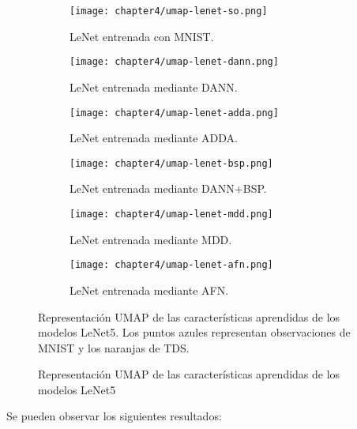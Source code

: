 \begin{figure}[H]
    \centering
    \begin{subfigure}[h]{0.40\textwidth}
        \texttt{[image: chapter4/umap-lenet-so.png]}
        \caption{LeNet entrenada con MNIST.}
        \label{fig:umap-lenet-so}
    \end{subfigure}
    \hfill
    \begin{subfigure}[h]{0.40\textwidth}
        \texttt{[image: chapter4/umap-lenet-dann.png]}
        \caption{LeNet entrenada mediante DANN.}
        \label{fig:umap-lenet-dann}
    \end{subfigure}
    \hfill
    \begin{subfigure}[h]{0.40\textwidth}
        \texttt{[image: chapter4/umap-lenet-adda.png]}
        \caption{LeNet entrenada mediante ADDA.}
        \label{fig:umap-lenet-adda}
    \end{subfigure}
    \hfill
    \begin{subfigure}[h]{0.40\textwidth}
        \texttt{[image: chapter4/umap-lenet-bsp.png]}
        \caption{LeNet entrenada mediante DANN+BSP.}
        \label{fig:umap-lenet-bsp}
    \end{subfigure}
    \hfill
    \begin{subfigure}[h]{0.40\textwidth}
        \texttt{[image: chapter4/umap-lenet-mdd.png]}
        \caption{LeNet entrenada mediante MDD.}
        \label{fig:umap-lenet-mdd}
    \end{subfigure}
    \hfill
    \begin{subfigure}[h]{0.40\textwidth}
        \texttt{[image: chapter4/umap-lenet-afn.png]}
        \caption{LeNet entrenada mediante AFN.}
        \label{fig:umap-lenet-afn}
    \end{subfigure}

    \caption{Representación UMAP de las características aprendidas de los modelos LeNet5}{Representación UMAP de las características aprendidas de los modelos LeNet5. Los puntos azules representan observaciones de MNIST y los naranjas de TDS.}
    \label{fig:umaps-lenet}
\end{figure}

Se pueden observar los siguientes resultados:

